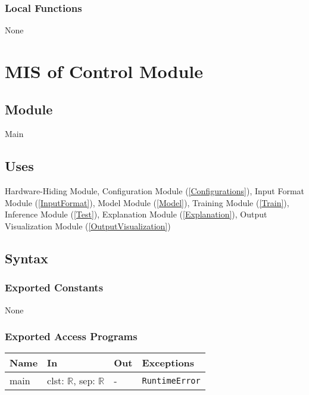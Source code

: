 \documentclass[12pt, titlepage]{article}
\begin{document}
\subsubsection{Local Functions}
None










\section{MIS of Control Module} \label{Control}

\subsection{Module}
Main

\subsection{Uses}
Hardware-Hiding Module, Configuration Module (\ref{Configurations}), Input Format Module (\ref{InputFormat}), Model Module (\ref{Model}), Training Module (\ref{Train}), Inference Module (\ref{Test}), 
Explanation Module (\ref{Explanation}), Output Visualization Module (\ref{OutputVisualization})

\subsection{Syntax}

\subsubsection{Exported Constants}
None

\subsubsection{Exported Access Programs}

\begin{center}
\begin{tabular}{p{3cm} p{6cm} p{4.5cm} p{3cm}}
\hline
\textbf{Name} & \textbf{In} & \textbf{Out} & \textbf{Exceptions} \\
\hline
main & clst: \(\mathbb{R}\), sep: \(\mathbb{R}\) & - & \texttt{RuntimeError} \\
\hline
\end{tabular}
\end{center}
\end{document}

